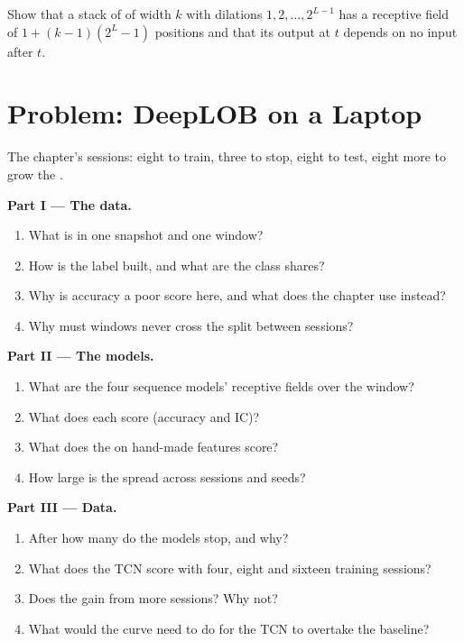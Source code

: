 \begin{exercise}[$\star\star\star$]\label{exo:ml:sequence-models-on-order-books:8}
Show that a stack of  of width $k$ with dilations $1, 2,\dots,2^{L-1}$ has a receptive field of
$1 + (k - 1)(2^L - 1)$ positions and that its output at $t$ depends on no input after $t$.
\end{exercise}

\section{Problem: DeepLOB on a Laptop}

\begin{problem}\label{pb:ml:sequence-models-on-order-books:1}
The chapter's sessions: eight to train, three to stop, eight to test, eight more to grow the .

\medskip\noindent\textbf{Part I --- The data.}
\begin{enumerate}
\item What is in one snapshot and one window?
\item How is the label built, and what are the class shares?
\item Why is accuracy a poor score here, and what does the chapter use instead?
\item Why must windows never cross the split between sessions?
\end{enumerate}

\medskip\noindent\textbf{Part II --- The models.}
\begin{enumerate}[resume]
\item What are the four sequence models' receptive fields over the window?
\item What does each score (accuracy and IC)?
\item What does the  on hand-made features score?
\item How large is the spread across sessions and seeds?
\end{enumerate}

\medskip\noindent\textbf{Part III --- Data.}
\begin{enumerate}[resume]
\item After how many  do the models stop, and why?
\item What does the TCN score with four, eight and sixteen training sessions?
\item Does the  gain from more sessions? Why not?
\item What would the curve need to do for the TCN to overtake the baseline?
\end{enumerate}


\end{problem}
